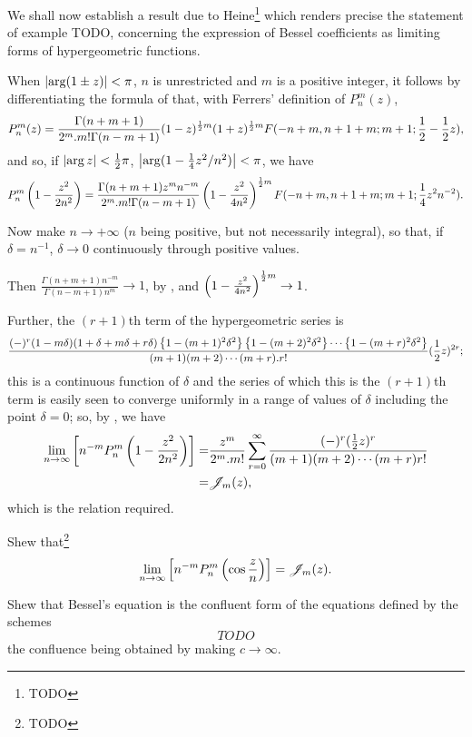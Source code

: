 We shall now establish a result due to Heine\footnote{TODO} which
renders precise the statement of  example
TODO, concerning the expression of Bessel coefficients as limiting
forms of hypergeometric functions.

When $\left| \arg(1\pm z) \right| < \pi$, $n$ is unrestricted and $m$ is a
positive integer, it follows by differentiating the formula of
 that, with Ferrers' definition of
$P_{n}^{m}(z)$,
$$
P_{n}^{m}(z)
=
\frac{\Gamma(n+m+1)}{2^{m} . m! \Gamma(n-m+1)}
(1-z)^{\frac{1}{2} m}
(1+z)^{\frac{1}{2} m}
F(-n+m,n+1+m; m+1; \frac{1}{2} - \frac{1}{2} z),
$$
and so, if $\left| \arg z \right| < \frac{1}{2}\pi$,
$\left| \arg (1 - \frac{1}{4} z^{2}/n^{2}) \right| < \pi$, we have
$$
P_{n}^{m}\left( 1 - \frac{z^{2}}{2n^{2}} \right)
=
\frac{\Gamma(n+m+1) z^{m} n^{-m}}{2^{m} . m! \Gamma(n-m+1)}
\left( 1 - \frac{z^{2}}{4n^{2}} \right)^{\frac{1}{2} m}
F(-n+m,n+1+m;m+1; \frac{1}{4} z^{2} n^{-2}).
$$

Now make $n \rightarrow +\infty$ ($n$ being positive, but not
necessarily integral), so that, if $\delta = n^{-1}$,
$\delta \rightarrow 0$ continuously through positive values.

Then
$ \frac{\Gamma(n+m+1)n^{-m}}{\Gamma(n-m+1) n^{m}} \rightarrow 1$,
by , and
$ \left( 1 - \frac{z^{2}}{4n^{2}} \right)^{\frac{1}{2} m} \rightarrow 1$.

Further, the $(r+1)$th term of the hypergeometric series is
$$
\frac{
  (-)^{r}
  (1-m\delta)
  (1+\delta+m\delta+r\delta)
  \left\{  1 - (m+1)^{2} \delta^{2}  \right\}
  \left\{  1 - (m+2)^{2} \delta^{2}  \right\}
  \cdots
  \left\{  1 - (m+r)^{2} \delta^{2}  \right\}
}{ (m+1)(m+2)\cdots(m+r).r!}
(\frac{1}{2} z)^{2r};
$$
this is a continuous function of $\delta$ and the series of which this
is the $(r+1)$th term is easily seen to converge uniformly in a range
of values of $\delta$ including the point $\delta=0$; so, by
, we have
\begin{align*}
  \lim_{n \rightarrow \infty}
  \left[  n^{-m} P_{n}^{m}\left( 1 - \frac{z^{2}}{2n^{2}} \right) \right]
  =& \frac{z^{m}}{2^{m}.m!}
  \sum_{r=0}^{\infty} \frac{(-)^{r} (\frac{1}{2}
    z)^{r}}{(m+1)(m+2)\cdots(m+r)r!} \\
  =& \mathscr{J}_{m}(z),
\end{align*}
which is the relation required.
\begin{wandwexample}
  Shew that\footnote{TODO}
  $$
  \lim_{n\rightarrow\infty}
  \left[  n^{-m} P_{n}^{m}\left( \cos \frac{z}{n} \right) \right] = \mathscr{J}_{m}(z).
  $$
\end{wandwexample}
%
%
\begin{wandwexample}
  Shew that Bessel's equation is the confluent form of the equations
  defined by the schemes
  $$
  TODO
  $$
  the confluence being obtained by making $c \rightarrow \infty$.
\end{wandwexample}

